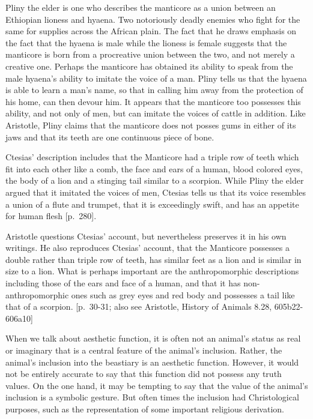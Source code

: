 \documentclass[
  letterpaper,
  DIV=11,
  numbers=noendperiod]{scrreprt}
\begin{document}
\begin{tcolorbox}[enhanced jigsaw, arc=.35mm, breakable, rightrule=.15mm, colback=white, colframe=quarto-callout-important-color-frame, bottomrule=.15mm, leftrule=.75mm, opacityback=0, toprule=.15mm, left=2mm]
\begin{tcolorbox}[enhanced jigsaw, arc=.35mm, breakable, rightrule=.15mm, colback=white, colframe=quarto-callout-tip-color-frame, bottomrule=.15mm, leftrule=.75mm, opacityback=0, toprule=.15mm, left=2mm]
Pliny the elder is one who describes the manticore as a union between an
Ethiopian lioness and hyaena. Two notoriously deadly enemies who fight
for the same for supplies across the African plain. The fact that he
draws emphasis on the fact that the hyaena is male while the lioness is
female suggests that the manticore is born from a procreative union
between the two, and not merely a creative one. Perhaps the manticore
has obtained its ability to speak from the male hyaena's ability to
imitate the voice of a man. Pliny tells us that the hyaena is able to
learn a man's name, so that in calling him away from the protection of
his home, can then devour him. It appears that the manticore too
possesses this ability, and not only of men, but can imitate the voices
of cattle in addition. Like Aristotle, Pliny claims that the manticore
does not posses gums in either of its jaws and that its teeth are one
continuous piece of bone.

Ctesias' description includes that the Manticore had a triple row of
teeth which fit into each other like a comb, the face and ears of a
human, blood colored eyes, the body of a lion and a stinging tail
similar to a scorpion. While Pliny the elder argued that it imitated the
voices of men, Ctesias tells us that its voice resembles a union of a
flute and trumpet, that it is exceedingly swift, and has an appetite for
human flesh {[}p.~280{]}.

Aristotle questions Ctesias' account, but nevertheless preserves it in
his own writings. He also reproduces Ctesias' account, that the
Manticore possesses a double rather than triple row of teeth, has
similar feet as a lion and is similar in size to a lion. What is perhaps
important are the anthropomorphic descriptions including those of the
ears and face of a human, and that it has non-anthropomorphic ones such
as grey eyes and red body and possesses a tail like that of a scorpion.
{[}p.~30-31; also see Aristotle, History of Animals 8.28,
605b22-606a10{]}

When we talk about aesthetic function, it is often not an animal's
status as real or imaginary that is a central feature of the animal's
inclusion. Rather, the animal's inclusion into the beastiary is an
aesthetic function. However, it would not be entirely accurate to say
that this function did not possess any truth values. On the one hand, it
may be tempting to say that the value of the animal's inclusion is a
symbolic gesture. But often times the inclusion had Christological
purposes, such as the representation of some important religious
derivation.


\end{tcolorbox}
\end{tcolorbox}
\end{document}
